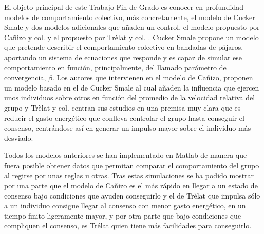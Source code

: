 \begin{resumen}

El objeto principal de este Trabajo Fin de Grado es conocer en profundidad modelos de comportamiento colectivo, más concretamente, el modelo de Cucker Smale y dos modelos adicionales que añaden un control, el modelo propuesto por Cañizo y col. \cite{canizo2010collective} y el propuesto por Trèlat y col. \cite{caponigro2015sparse}. Cucker Smale propone un modelo que pretende describir el comportamiento colectivo en bandadas de pájaros, aportando un sistema de ecuaciones que responde y es capaz de simular ese comportamiento en función, principalmente, del llamado parámetro de convergencia, $\beta$. Los autores que intervienen en el modelo de Cañizo, proponen un modelo basado en el de Cucker Smale al cual añaden la influencia que ejercen unos individuos sobre otros en función del promedio de la velocidad relativa del grupo y Trèlat y col. centran sus estudios en una premisa muy clara que es reducir el gasto energético que conlleva controlar el grupo hasta conseguir el consenso, centrándose así en generar un impulso mayor sobre el individuo más desviado.

Todos los modelos anteriores se han implementado en Matlab de manera que fuera posible obtener datos que permitan comparar el comportamiento del grupo al regirse por unas reglas u otras. Tras estas simulaciones se ha podido mostrar por una parte que el modelo de Cañizo es el más rápido en llegar a un estado de consenso bajo condiciones que ayuden conseguirlo y el de Trèlat que impulsa sólo a un individuo consigue llegar al consenso con menor gasto energético, en un tiempo finito ligeramente mayor, y por otra parte que bajo condiciones que compliquen el consenso, es Trélat quien tiene más facilidades para conseguirlo.

\end{resumen}


